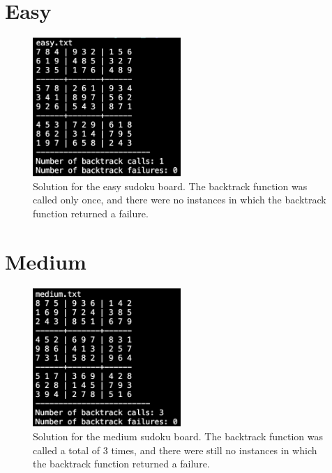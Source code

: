 \documentclass{article}
\begin{document}
    \mainmatter

    \section*{Easy}

    \begin{figure}[H]
        \centering
        \includegraphics[width=0.5\textwidth]{Images/easy.png}
        \caption[Easy solution]{Solution for the easy sudoku board. The backtrack function was called only once, and there were no instances in which the backtrack function returned a failure.}
        \label{fig:Easy solution}
    \end{figure}

    \section*{Medium}

    \begin{figure}[H]
        \centering
        \includegraphics[width=0.5\textwidth]{Images/medium.png}
        \caption[Medium solution]{Solution for the medium sudoku board. The backtrack function was called a total of 3 times, and there were still no instances in which the backtrack function returned a failure.}
        \label{fig:Medium solution}
    \end{figure}
\end{document}
